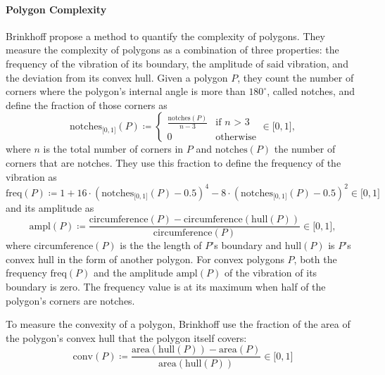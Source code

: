 \paragraph{Polygon Complexity}

Brinkhoff \etal{} \cite{brinkhoff1995measuring} propose a method to quantify the complexity of polygons.
They measure the complexity of polygons as a combination of three properties: the frequency of the vibration of its boundary, the amplitude of said vibration, and the deviation from its convex hull.
Given a polygon $P$, they count the number of corners where the polygon's internal angle is more than $180^\circ$, called notches, and define the fraction of those corners as
%
\begin{equation*}
\text{notches}_{\lbrack0,1\rbrack}(P) \coloneqq
\begin{cases}
\frac{\text{notches}(P)}{n - 3} & \text{if $n$ > 3}\\
0 & \text{otherwise}
\end{cases}
\in \lbrack0,1\rbrack
,
\end{equation*}
%
where $n$ is the total number of corners in $P$ and $\text{notches}(P)$ the number of corners that are notches.
They use this fraction to define the frequency of the vibration as
%
\begin{equation*}
\text{freq}(P) \coloneqq 1
+ 16 \cdot (\text{notches}_{\lbrack0,1\rbrack}(P) - 0.5)^4
- 8 \cdot (\text{notches}_{\lbrack0,1\rbrack}(P) - 0.5)^2
\in \lbrack0,1\rbrack
\end{equation*}
%
and its amplitude as
\begin{equation*}
\text{ampl}(P) \coloneqq
\frac{\text{circumference}(P) - \text{circumference}(\text{hull}(P))}{\text{circumference}(P)}
\in \lbrack0,1\rbrack
,
\end{equation*}
%
where $\text{circumference}(P)$ is the the length of $P$'s boundary and $\text{hull}(P)$ is $P$'s convex hull in the form of another polygon.
For convex polygons $P$, both the frequency $\text{freq}(P)$ and the amplitude $\text{ampl}(P)$ of the vibration of its boundary is zero.
The frequency value is at its maximum when half of the polygon's corners are notches.

To measure the convexity of a polygon, Brinkhoff \etal{} use the fraction of the area of the polygon's convex hull that the polygon itself covers:
%
\begin{equation*}
\text{conv}(P) \coloneqq
\frac{\text{area}(\text{hull}(P)) - \text{area}(P)}{\text{area}(\text{hull}(P))}
\in \lbrack0,1\rbrack
\end{equation*}

